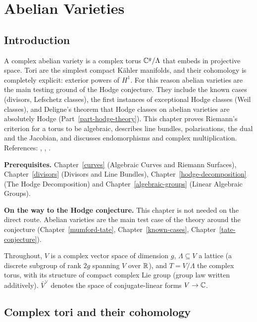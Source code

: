 \chapter{Abelian Varieties}\label{abelian-varieties}

\section{Introduction}\label{abelian-varieties:section-introduction}

A complex abelian variety is a complex torus $\mathbb{C}^g/\Lambda$ that embeds in projective space. Tori are the simplest compact K\"ahler manifolds, and their
cohomology is completely explicit: exterior powers of $H^1$. For this reason abelian varieties are the main testing ground of the Hodge conjecture. They
include the known cases (divisors, Lefschetz classes), the first instances of exceptional Hodge classes (Weil classes), and Deligne's theorem that Hodge classes
on abelian varieties are absolutely Hodge (Part~\ref{part-hodge-theory}). This chapter proves Riemann's criterion for a torus to be algebraic, describes line
bundles, polarisations, the dual and the Jacobian, and discusses endomorphisms and complex multiplication. References: \cite{birkenhake-lange},
\cite{mumford-abelian}, \cite[Chapter 2, Section 6]{griffiths-harris}.

\noindent\textbf{Prerequisites.} Chapter~\ref{curves} (Algebraic Curves and Riemann Surfaces), Chapter~\ref{divisors} (Divisors and Line Bundles),
Chapter~\ref{hodge-decomposition} (The Hodge Decomposition) and Chapter~\ref{algebraic-groups} (Linear Algebraic Groups).

\noindent\textbf{On the way to the Hodge conjecture.} This chapter is not needed on the direct route. Abelian varieties are the main test case of the theory around the conjecture
(Chapter~\ref{mumford-tate}, Chapter~\ref{known-cases}, Chapter~\ref{tate-conjecture}).

Throughout, $V$ is a complex vector space of dimension $g$, $\Lambda \subseteq V$ a lattice (a discrete subgroup of rank $2g$ spanning $V$ over $\mathbb{R}$), and $T = V/\Lambda$ the complex
torus, with its structure of compact complex Lie group (group law written additively). $\bar V^\vee$ denotes the space of conjugate-linear forms $V \to \mathbb{C}$.

\section{Complex tori and their cohomology}\label{abelian-varieties:section-tori}

